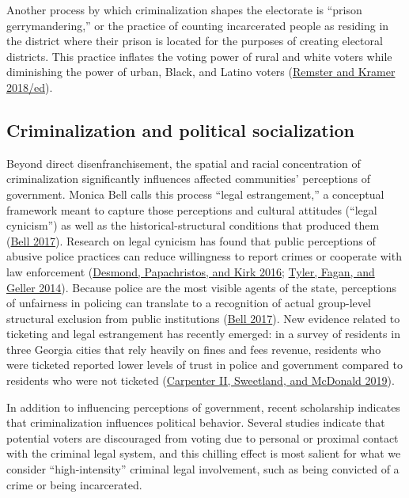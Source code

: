 \documentclass[
  12pt,
]{article}
\begin{document}
Another process by which criminalization shapes the electorate is ``prison gerrymandering,'' or the practice of counting incarcerated people as residing in the district where their prison is located for the purposes of creating electoral districts. This practice inflates the voting power of rural and white voters while diminishing the power of urban, Black, and Latino voters (\protect\hyperlink{ref-Remster2018}{Remster and Kramer 2018/ed}).

\hypertarget{criminalization-and-political-socialization}{%
\subsection*{Criminalization and political socialization}\label{criminalization-and-political-socialization}}

Beyond direct disenfranchisement, the spatial and racial concentration of criminalization significantly influences affected communities' perceptions of government. Monica Bell calls this process ``legal estrangement,'' a conceptual framework meant to capture those perceptions and cultural attitudes (``legal cynicism'') as well as the historical-structural conditions that produced them (\protect\hyperlink{ref-Bell2017}{Bell 2017}). Research on legal cynicism has found that public perceptions of abusive police practices can reduce willingness to report crimes or cooperate with law enforcement (\protect\hyperlink{ref-Desmond2016}{Desmond, Papachristos, and Kirk 2016}; \protect\hyperlink{ref-Tyler2014}{Tyler, Fagan, and Geller 2014}). Because police are the most visible agents of the state, perceptions of unfairness in policing can translate to a recognition of actual group-level structural exclusion from public institutions (\protect\hyperlink{ref-Bell2017}{Bell 2017}). New evidence related to ticketing and legal estrangement has recently emerged: in a survey of residents in three Georgia cities that rely heavily on fines and fees revenue, residents who were ticketed reported lower levels of trust in police and government compared to residents who were not ticketed (\protect\hyperlink{ref-CarpenterII2019}{Carpenter II, Sweetland, and McDonald 2019}).

In addition to influencing perceptions of government, recent scholarship indicates that criminalization influences political behavior. Several studies indicate that potential voters are discouraged from voting due to personal or proximal contact with the criminal legal system, and this chilling effect is most salient for what we consider ``high-intensity'' criminal legal involvement, such as being convicted of a crime or being incarcerated.
\end{document}
